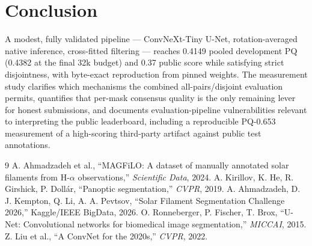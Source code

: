 \documentclass[conference]{IEEEtran}
\begin{document}
\section{Conclusion}
A modest, fully validated pipeline --- ConvNeXt-Tiny U-Net, rotation-averaged native
inference, cross-fitted filtering --- reaches 0.4149 pooled development PQ (0.4382 at
the final 32k budget) and 0.37 public score while satisfying strict disjointness, with
byte-exact reproduction from pinned weights. The measurement study clarifies
which mechanisms the combined all-pairs/disjoint evaluation permits, quantifies that
per-mask consensus quality is the only remaining lever for honest submissions, and
documents evaluation-pipeline vulnerabilities relevant to interpreting the public
leaderboard, including a reproducible PQ-0.653 measurement of a high-scoring
third-party artifact against public test annotations.

\begin{thebibliography}{9}
 A. Ahmadzadeh et al., ``MAGFiLO: A dataset of manually annotated
solar filaments from H-$\alpha$ observations,'' \emph{Scientific Data}, 2024.
 A. Kirillov, K. He, R. Girshick, P. Doll\'ar, ``Panoptic segmentation,''
\emph{CVPR}, 2019.
 A. Ahmadzadeh, D. J. Kempton, Q. Li, A. A. Pevtsov, ``Solar
Filament Segmentation Challenge 2026,'' Kaggle/IEEE BigData, 2026.
 O. Ronneberger, P. Fischer, T. Brox, ``U-Net: Convolutional networks
for biomedical image segmentation,'' \emph{MICCAI}, 2015.
 Z. Liu et al., ``A ConvNet for the 2020s,'' \emph{CVPR}, 2022.
\end{thebibliography}
\end{document}
